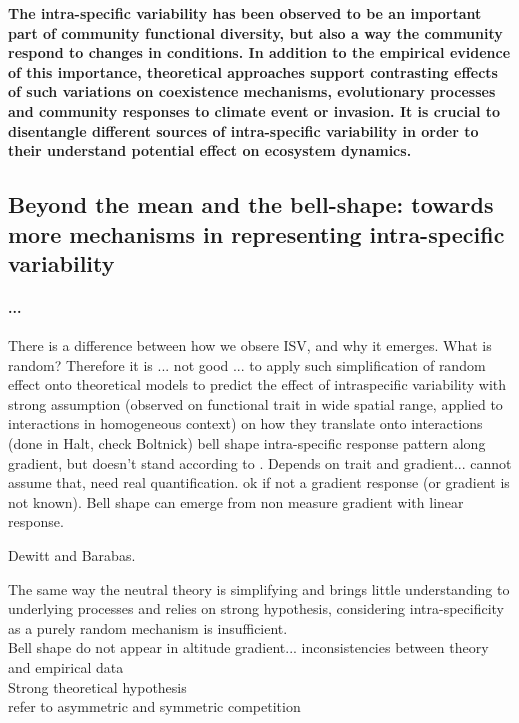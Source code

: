 \textbf{The intra-specific variability has been observed to be an important part of community functional diversity, but also a way the community respond to changes in conditions. In addition to the empirical evidence of this importance, theoretical approaches support contrasting effects of such variations on coexistence mechanisms, evolutionary processes and community responses to climate event or invasion. It is crucial to disentangle different sources of intra-specific variability in order to their understand potential effect on ecosystem dynamics.}

\subsection{Beyond the mean and the bell-shape: towards more mechanisms in representing intra-specific variability}\label{subsection:bell-shape}

\paragraph{...}
There is a difference between how we obsere ISV, and why it emerges. What is random? Therefore it is  ... not good ... to apply such simplification of random effect onto theoretical models to predict the effect of intraspecific variability with strong assumption (observed on functional trait in wide spatial range, applied to interactions in homogeneous context) on how they translate onto interactions (done in Halt, check Boltnick) 
\cite{albert_intraspecific_2010} bell shape intra-specific response pattern along gradient, but doesn't stand according to \cite{kichenin_contrasting_2013}. Depends on trait and gradient... cannot assume that, need real quantification. ok if not a gradient response (or gradient is not known).
Bell shape can emerge from non measure gradient with linear response. 

Dewitt and Barabas.

The same way the neutral theory is simplifying and brings little understanding to underlying processes and relies on strong hypothesis, considering intra-specificity as a purely random mechanism is insufficient.\\
Bell shape do not appear in altitude gradient... inconsistencies between theory and empirical data\\
Strong theoretical hypothesis\\
refer to asymmetric and symmetric competition\\

